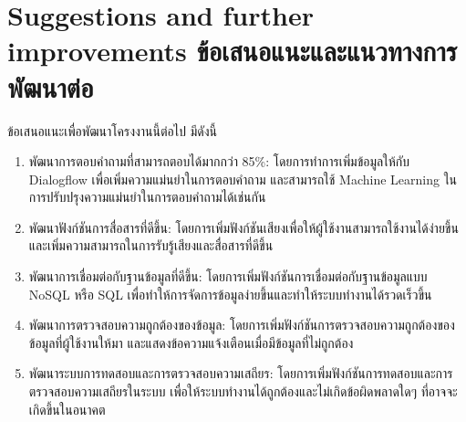 \section{\ifenglish%
Suggestions and further improvements
\else%
ข้อเสนอแนะและแนวทางการพัฒนาต่อ
\fi
}

ข้อเสนอแนะเพื่อพัฒนาโครงงานนี้ต่อไป มีดังนี้
\begin{enumerate}
  \item พัฒนาการตอบคำถามที่สามารถตอบได้มากกว่า 85\%: โดยการทำการเพิ่มข้อมูลให้กับ Dialogflow เพื่อเพิ่มความแม่นยำในการตอบคำถาม และสามารถใช้ Machine Learning ในการปรับปรุงความแม่นยำในการตอบคำถามได้เช่นกัน
  \item พัฒนาฟังก์ชันการสื่อสารที่ดีขึ้น: โดยการเพิ่มฟังก์ชันเสียงเพื่อให้ผู้ใช้งานสามารถใช้งานได้ง่ายขึ้น และเพิ่มความสามารถในการรับรู้เสียงและสื่อสารที่ดีขึ้น
  \item พัฒนาการเชื่อมต่อกับฐานข้อมูลที่ดีขึ้น: โดยการเพิ่มฟังก์ชันการเชื่อมต่อกับฐานข้อมูลแบบ NoSQL หรือ SQL เพื่อทำให้การจัดการข้อมูลง่ายขึ้นและทำให้ระบบทำงานได้รวดเร็วขึ้น
  \item พัฒนาการตรวจสอบความถูกต้องของข้อมูล: โดยการเพิ่มฟังก์ชันการตรวจสอบความถูกต้องของข้อมูลที่ผู้ใช้งานให้มา และแสดงข้อความแจ้งเตือนเมื่อมีข้อมูลที่ไม่ถูกต้อง
  \item พัฒนาระบบการทดสอบและการตรวจสอบความเสถียร: โดยการเพิ่มฟังก์ชันการทดสอบและการตรวจสอบความเสถียรในระบบ เพื่อให้ระบบทำงานได้ถูกต้องและไม่เกิดข้อผิดพลาดใดๆ ที่อาจจะเกิดขึ้นในอนาคต
\end{enumerate}